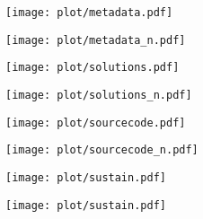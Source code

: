 \documentclass[headsepline,titlepage,twoside,12pt,toc=flat,headings=normal]{scrreprt}
\begin{document}

\begin{figure}[h!]
\texttt{[image: plot/metadata.pdf]}
\caption{}
\label{fig:metadata}
\end{figure}

\begin{figure}[h!]
\texttt{[image: plot/metadata\_n.pdf]}
\caption{}
\label{fig:metadata_n}
\end{figure}


\begin{figure}[h!]
\texttt{[image: plot/solutions.pdf]}
\caption{}
\label{fig:solutions}
\end{figure}

\begin{figure}[h!]
\texttt{[image: plot/solutions\_n.pdf]}
\caption{}
\label{fig:solutions_n}
\end{figure}


\begin{figure}[h!]
\texttt{[image: plot/sourcecode.pdf]}
\caption{}
\label{fig:sourcecode}
\end{figure}

\begin{figure}[h!]
\texttt{[image: plot/sourcecode\_n.pdf]}
\caption{}
\label{fig:sourcecode_n}
\end{figure}


\begin{figure}[h!]
\texttt{[image: plot/sustain.pdf]}
\caption{}
\label{fig:sustain}
\end{figure}

\begin{figure}[h!]
\texttt{[image: plot/sustain.pdf]}
\caption{}
\label{fig:sustain_n}
\end{figure}
\end{document}
